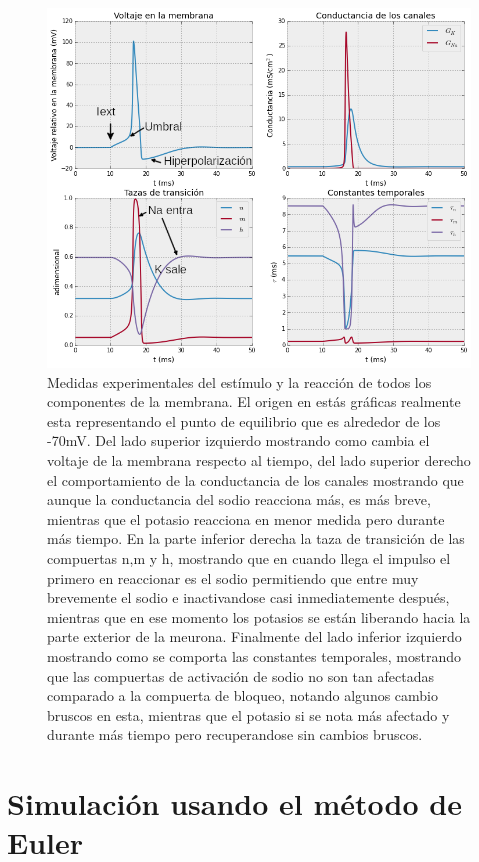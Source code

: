 \begin{figure}[H]
 \includegraphics[scale=0.6]{../Figuras/disparo.png}
 \caption{Medidas experimentales del estímulo y la reacción de todos los componentes de la membrana. El origen en estás gráficas realmente esta representando el punto de equilibrio que es alrededor de los -70mV. Del lado superior izquierdo mostrando como cambia el voltaje de la membrana respecto al tiempo, del lado superior derecho el comportamiento de la conductancia de los canales mostrando que aunque la conductancia del sodio reacciona más, es más breve, mientras que el potasio reacciona en menor medida pero durante más tiempo. En la parte inferior derecha la taza de transición de las compuertas n,m y h, mostrando que en cuando llega el impulso el primero en reaccionar es el sodio permitiendo que entre muy brevemente el sodio e inactivandose casi inmediatemente después, mientras que en ese momento los potasios se están liberando hacia la parte exterior de la meurona. Finalmente del lado inferior izquierdo mostrando como se comporta las constantes temporales, mostrando que las compuertas de activación de sodio no son tan afectadas comparado a la compuerta de bloqueo, notando algunos cambio bruscos en esta, mientras que el potasio si se nota más afectado y durante más tiempo pero recuperandose sin cambios bruscos. }
 \label{fig:voltajeActInac1}
\end{figure}




\section{Simulación usando el método de Euler}

